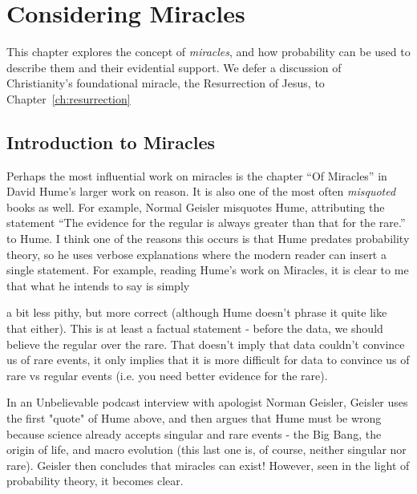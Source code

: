 \chapter{Considering Miracles}\label{ch:miracles}

\newcommand{\hrb}[1]{\href{http://web.bryant.edu/~bblais/#1}{#1}}





This chapter explores the concept of {\em miracles}, and how probability can be used to describe them and their evidential support.  We defer a discussion of Christianity's foundational miracle, the Resurrection of Jesus, to Chapter~\ref{ch:resurrection}


\section{Introduction to Miracles}

Perhaps the most influential work on miracles is the chapter ``Of Miracles'' in David Hume's larger work on reason\cite{Hume:1748aa}.  It is also one of the most often \emph{misquoted} books as well.  For example, Normal Geisler misquotes Hume\cite{Brierley:2008ab}, attributing the statement ``The evidence for the regular is always greater than that for the rare.'' to Hume.  I think one of the reasons this occurs is that Hume predates probability theory, so he uses verbose explanations where the modern reader can insert a single statement. For example, reading Hume's work on Miracles, it is clear to me that what he intends to say is simply


a bit less pithy, but more correct (although Hume doesn't phrase it quite like that either). This is at least a factual statement - before the data, we should believe the regular over the rare. That doesn't imply that data couldn't convince us of rare events, it only implies that it is more difficult for data to convince us of rare vs regular events (i.e. you need better evidence for the rare).

In an Unbelievable podcast interview with apologist Norman Geisler\cite{Brierley:2008ab}, Geisler uses the first "quote" of Hume above, and then argues that Hume must be wrong because science already accepts singular and rare events - the Big Bang, the origin of life, and macro evolution (this last one is, of course, neither singular nor rare). Geisler then concludes that miracles can exist! However, seen in the light of probability theory, it becomes clear. 

